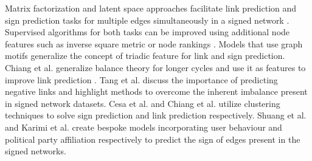 Matrix factorization and latent space approaches facilitate link prediction and sign prediction tasks for multiple edges simultaneously in a signed network \cite{agrawal2013link,hsieh2012low,gu2019link}. Supervised algorithms for both tasks can be improved using additional node features such as inverse square metric \cite{ahmadalinezhad2018sign} or node rankings \cite{shahriari2014ranking}. Models that use graph motifs \cite{Liu2019LinkPrediction,khodadadi2017sign} generalize the concept of triadic feature for link and sign prediction. Chiang et al. generalize balance theory for longer cycles and use it as features to improve link prediction \cite{chiang2011exploiting}. Tang et al. \cite{Jiliang2015Negative} discuss the importance of predicting negative links and highlight methods to overcome the inherent imbalance present in signed network datasets. Cesa et al. \cite{cesa2012correlation} and Chiang et al. \cite{chiang2014prediction} utilize clustering techniques to solve sign prediction and link prediction respectively. Shuang et al. \cite{Shuang-Hong2012Friend}  and Karimi et al. \cite{karimi2019multicongress} create bespoke models incorporating user behaviour and political party affiliation respectively to predict the sign of edges present in the signed networks.


